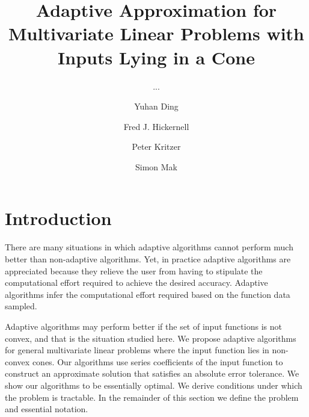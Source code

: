 \documentclass[USenglish]{article}
\theoremstyle{dgthm}
\theoremstyle{dgthm}
\theoremstyle{dgthm}
\theoremstyle{dgthm}
\theoremstyle{dgdef}
\begin{document}

  \author[1]{Yuhan Ding}
  \author*[2]{Fred J. Hickernell}
  \author[3]{Peter Kritzer} 
  \author[4]{Simon Mak}
  \title{Adaptive Approximation for Multivariate Linear Problems with Inputs Lying in a Cone}
  \subtitle{...}
  \aop

\maketitle


\section{Introduction} 

There are many situations in which adaptive algorithms cannot perform much better than non-adaptive algorithms.  Yet, in practice adaptive algorithms are appreciated because they relieve the user from having to stipulate the computational effort required to achieve the desired accuracy.  Adaptive algorithms infer the computational effort required based on the function data sampled.

Adaptive algorithms may perform better if the set of input functions is not convex, and that is the situation studied here. We propose adaptive algorithms for general multivariate linear problems where the input function lies in non-convex cones.  Our algorithms use series coefficients of the input function to construct an approximate solution that satisfies an absolute error tolerance.  We show our algorithms to be essentially optimal.  We derive conditions under which the problem is tractable.  In the remainder of this section we define the problem and essential notation.
\end{document}
